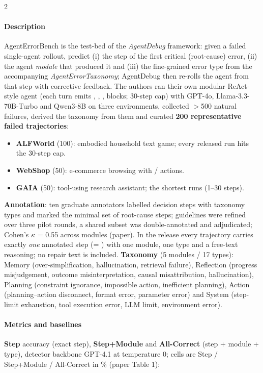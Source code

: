 \begin{multicols}{2}
\paragraph{Description} AgentErrorBench is the test-bed of the \emph{AgentDebug} framework: given a failed single-agent rollout, predict (i) the step of the first critical (root-cause) error, (ii) the agent \emph{module} that produced it and (iii) the fine-grained error type from the accompanying \emph{AgentErrorTaxonomy}; AgentDebug then re-rolls the agent from that step with corrective feedback. The authors ran their own modular ReAct-style agent (each turn emits , , ,  blocks; 30-step cap) with GPT-4o, Llama-3.3-70B-Turbo and Qwen3-8B on three environments, collected $>$500 natural failures, derived the taxonomy from them and curated \textbf{200 representative failed trajectories}:
\begin{itemize}
\item \textbf{ALFWorld} (100): embodied household text game; every released run hits the 30-step cap.
\item \textbf{WebShop} (50): e-commerce browsing with  /  actions.
\item \textbf{GAIA} (50): tool-using research assistant; the shortest runs (1--30 steps).
\end{itemize}
\textbf{Annotation}: ten graduate annotators labelled decision steps with taxonomy types and marked the minimal set of root-cause steps; guidelines were refined over three pilot rounds, a shared subset was double-annotated and adjudicated; Cohen's $\kappa$ = 0.55 across modules (paper). In the release every trajectory carries exactly \emph{one} annotated step (= ) with one module, one type and a free-text reasoning; no repair text is included. \textbf{Taxonomy} (5 modules / 17 types): Memory (over-simplification, hallucination, retrieval failure), Reflection (progress misjudgement, outcome misinterpretation, causal misattribution, hallucination), Planning (constraint ignorance, impossible action, inefficient planning), Action (planning--action disconnect, format error, parameter error) and System (step-limit exhaustion, tool execution error, LLM limit, environment error).

\paragraph{Metrics and baselines} \textbf{Step} accuracy (exact step), \textbf{Step+Module} and \textbf{All-Correct} (step + module + type), detector backbone GPT-4.1 at temperature 0; cells are Step / Step+Module / All-Correct in \% (paper Table 1):


\end{multicols}
